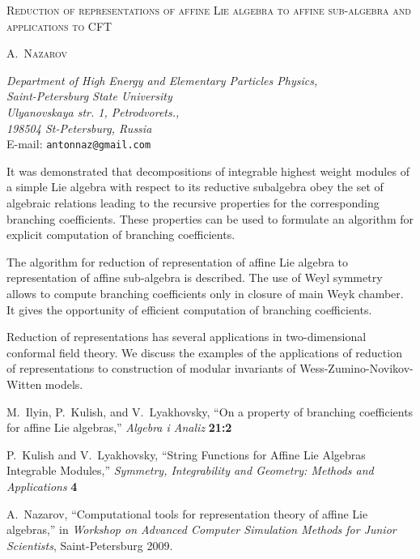 \documentclass{article}
\def\title#1{\begin{center}#1\end{center}}
\def\author#1{\centerline{\small{\textsc{#1}}}}
\def\address#1#2{\begin{center}\small\emph{#1}\\E-mail: \texttt{#2}\end{center}}
\begin{document}
\title{\textsc{Reduction of representations of affine Lie algebra to affine sub-algebra and applications to CFT}}

\author{A.~Nazarov}

\address{Department of High Energy and Elementary Particles Physics, \\ Saint-Petersburg State University\\
Ulyanovskaya str. 1, Petrodvorets., \\
198504 St-Petersburg, Russia}{antonnaz@gmail.com}

\bigskip

\small

   It was demonstrated \cite{ilyin812pbc} that decompositions of integrable highest weight
modules of a simple Lie algebra with respect to its reductive subalgebra
obey the set of algebraic relations leading to the recursive properties for
the corresponding branching coefficients. These properties can be used to formulate an algorithm for explicit computation of branching coefficients.

The algorithm for reduction of representation of affine Lie algebra to representation of affine sub-algebra is described. The use of Weyl symmetry allows to compute branching coefficients only in closure of main Weyk chamber. It gives the opportunity of efficient computation of branching coefficients.

Reduction of representations has several applications in two-dimensional conformal field theory. We discuss the examples of the applications of reduction of representations to construction of modular invariants of Wess-Zumino-Novikov-Witten models.

\begin{thebibliography}{5}\footnotesize


M.~Ilyin, P.~Kulish, and V.~Lyakhovsky, ``{On a property of branching
  coefficients for affine Lie algebras},'' {\em Algebra i Analiz} {\bf 21:2} 

P.~Kulish and V.~Lyakhovsky, ``{String Functions for Affine Lie Algebras
  Integrable Modules},'' {\em Symmetry, Integrability and Geometry: Methods and
  Applications} {\bf 4}

A.~Nazarov, ``Computational tools for representation theory of affine Lie algebras,'' in {\em Workshop on Advanced Computer Simulation Methods for Junior Scientists}, Saint-Petersburg 2009.

\end{thebibliography}
\end{document}
